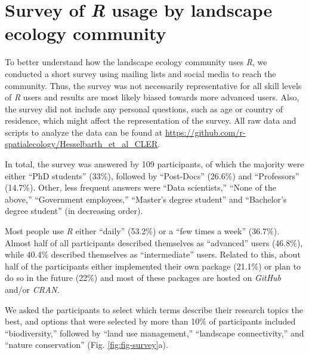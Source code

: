 \documentclass[smallextended]{svjour3}       %
\begin{document}
\begin{table}
\begin{tabularx}{1.35\linewidth}{lrXr}
\end{tabularx}

\label{tab:packages}

\end{table}

\FloatBarrier

\hypertarget{survey-of-usage-by-landscape-ecology-community}{%
\section{\texorpdfstring{Survey of \textit{R} usage by landscape ecology community}{Survey of  usage by landscape ecology community}}\label{survey-of-usage-by-landscape-ecology-community}}

To better understand how the landscape ecology community uses \textit{R}, we conducted a short survey using mailing lists and social media to reach the community.
Thus, the survey was not necessarily representative for all skill levels of \textit{R} users and results are most likely biased towards more advanced users.
Also, the survey did not include any personal questions, such as age or country of residence, which might affect the representation of the survey.
All raw data and scripts to analyze the data can be found at \url{https://github.com/r-spatialecology/Hesselbarth_et_al_CLER}.

In total, the survey was answered by 109 participants, of which the majority were either ``PhD students'' (33\%), followed by ``Post-Docs'' (26.6\%) and ``Professors'' (14.7\%).
Other, less frequent answers were ``Data scientists,'' ``None of the above,'' ``Government employees,'' ``Master's degree student'' and ``Bachelor's degree student'' (in decreasing order).

Most people use \textit{R} either ``daily'' (53.2\%) or a ``few times a week'' (36.7\%).
Almost half of all participants described themselves as ``advanced'' users (46.8\%), while 40.4\% described themselves as ``intermediate'' users.
Related to this, about half of the participants either implemented their own package (21.1\%) or plan to do so in the future (22\%) and most of these packages are hosted on \textit{GitHub} and/or \textit{CRAN}.

We asked the participants to select which terms describe their research topics the best, and options that were selected by more than 10\% of participants included ``biodiversity,'' followed by ``land use management,'' ``landscape connectivity,'' and ``nature conservation'' (Fig. \ref{fig:fig-survey}a).
\end{document}
